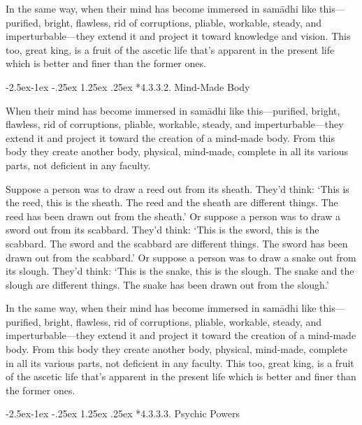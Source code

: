 \documentclass[12pt,openany]{book}%
\makeatletter
\renewcommand\paragraph{\@startsection{paragraph}{4}{\z@}%
            {-2.5ex\@plus -1ex \@minus -.25ex}%
            {1.25ex \@plus .25ex}%
            {\noindent\Semiboldnormalfont\normalsize}}
\makeatother
\begin{document}
In the same way, when their mind has become immersed in \textsanskrit{samādhi} like this—purified, bright, flawless, rid of corruptions, pliable, workable, steady, and imperturbable—they extend it and project it toward knowledge and vision. This too, great king, is a fruit of the ascetic life that’s apparent in the present life which is better and finer than the former ones. 

\paragraph*{4.3.3.2. Mind-Made Body }

When their mind has become immersed in \textsanskrit{samādhi} like this—purified, bright, flawless, rid of corruptions, pliable, workable, steady, and imperturbable—they extend it and project it toward the creation of a mind-made body. From this body they create another body, physical, mind-made, complete in all its various parts, not deficient in any faculty. 

Suppose a person was to draw a reed out from its sheath. They’d think: ‘This is the reed, this is the sheath. The reed and the sheath are different things. The reed has been drawn out from the sheath.’ Or suppose a person was to draw a sword out from its scabbard. They’d think: ‘This is the sword, this is the scabbard. The sword and the scabbard are different things. The sword has been drawn out from the scabbard.’ Or suppose a person was to draw a snake out from its slough. They’d think: ‘This is the snake, this is the slough. The snake and the slough are different things. The snake has been drawn out from the slough.’ 

In the same way, when their mind has become immersed in \textsanskrit{samādhi} like this—purified, bright, flawless, rid of corruptions, pliable, workable, steady, and imperturbable—they extend it and project it toward the creation of a mind-made body. From this body they create another body, physical, mind-made, complete in all its various parts, not deficient in any faculty. This too, great king, is a fruit of the ascetic life that’s apparent in the present life which is better and finer than the former ones. 

\paragraph*{4.3.3.3. Psychic Powers }
\end{document}
